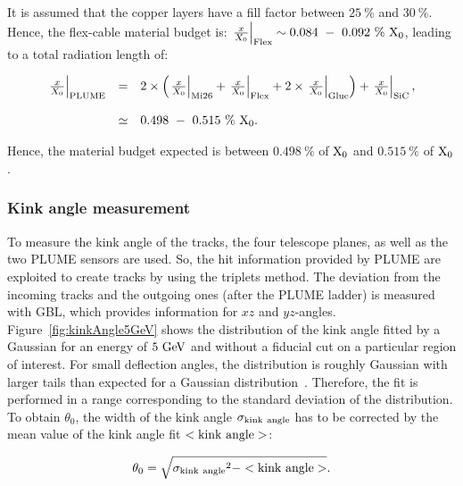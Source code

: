      It is assumed that the copper layers have a fill factor between $25~\%$ and $30~\%$.
     Hence, the flex-cable material budget is: $\left. \frac{x}{X_0} \right|_{\rm{Flex}} \sim 0.084~-~0.092~\%~\rm{X_0}$, leading to a total radiation length of:

     \begin{equation}
       \begin{array}{lcl}
         \left. \frac{x}{X_0} \right|_{\rm{PLUME}} & = & 2 \times \left( \left. \frac{x}{X_0} \right|_{\rm{Mi26}} + \left. \frac{x}{X_0} \right|_{\rm{Flex}} + 2 \times \left. \frac{x}{X_0} \right|_{\rm{Glue}}\right) + \left. \frac{x}{X_0} \right|_{\rm{SiC}}, \\
         \\
         & \simeq & 0.498~-~0.515~\%~\rm{X_0}.
       \end{array}
       \label{eq:X0_theory}
     \end{equation}

     Hence, the material budget expected is between $0.498~\%$ of $\rm{X_0}$ and $0.515~\%$ of $\rm{X_0}$.

     \subsubsection{Kink angle measurement}

   To measure the kink angle of the tracks, the four telescope planes, as well as the two \gls{PLUME} sensors are used.
   So, the hit information provided by \gls{PLUME} are exploited to create tracks by using the triplets method.
   The deviation from the incoming tracks and the outgoing ones (after the \gls{PLUME} ladder) is measured with \gls{GBL}, which provides information for $xz$ and $yz$-angles.
   Figure~\ref{fig:kinkAngle5GeV} shows the distribution of the kink angle fitted by a Gaussian for an energy of $5~\rm{GeV}$ and without a fiducial cut on a particular region of interest.
   For small deflection angles, the distribution is roughly Gaussian with larger tails than expected for a Gaussian distribution~\cite{Agashe:2014kda}.
   Therefore, the fit is performed in a range corresponding to the standard deviation of the distribution.
   To obtain $\theta_0$, the width of the kink angle $\rm{\sigma_{kink~angle}}$ has to be corrected by the mean value of the kink angle fit $<\rm{kink~angle}>$:
   
   \begin{equation}
     \theta_0 = \sqrt{\rm{\sigma_{kink~angle}}^2 - <\rm{kink~angle}>}.
     \label{eq:kink}
   \end{equation}
   
